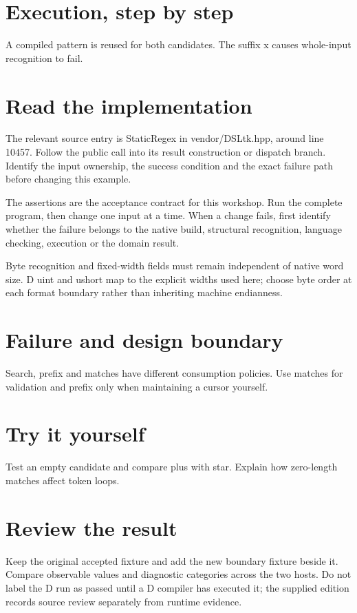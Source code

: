 
\section*{Execution, step by step}
A compiled pattern is reused for both candidates. The suffix x causes whole-input recognition to fail.

\section*{Read the implementation}
The relevant source entry is StaticRegex in vendor/DSLtk.hpp, around line 10457. Follow the public call into its result construction or dispatch branch. Identify the input ownership, the success condition and the exact failure path before changing this example.

The assertions are the acceptance contract for this workshop. Run the complete program, then change one input at a time. When a change fails, first identify whether the failure belongs to the native build, structural recognition, language checking, execution or the domain result.

\clearpage
{}
Byte recognition and fixed-width fields must remain independent of native word size. D uint and ushort map to the explicit widths used here; choose byte order at each format boundary rather than inheriting machine endianness.


\section*{Failure and design boundary}
Search, prefix and matches have different consumption policies. Use matches for validation and prefix only when maintaining a cursor yourself.

\section*{Try it yourself}
Test an empty candidate and compare plus with star. Explain how zero-length matches affect token loops.

\section*{Review the result}
Keep the original accepted fixture and add the new boundary fixture beside it. Compare observable values and diagnostic categories across the two hosts. Do not label the D run as passed until a D compiler has executed it; the supplied edition records source review separately from runtime evidence.

